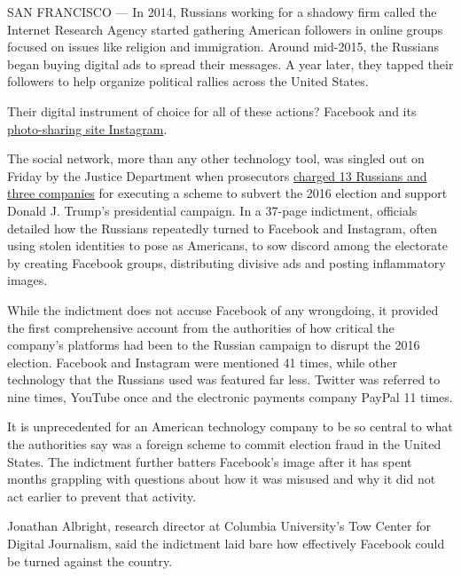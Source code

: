SAN FRANCISCO --- In 2014, Russians working for a shadowy firm called
the Internet Research Agency started gathering American followers in
online groups focused on issues like religion and immigration. Around
mid-2015, the Russians began buying digital ads to spread their
messages. A year later, they tapped their followers to help organize
political rallies across the United States.

Their digital instrument of choice for all of these actions? Facebook
and its
\href{https://www.nytimes3xbfgragh.onion/2017/12/17/technology/instagram-russian-trolls.html}{photo-sharing
site Instagram}.

The social network, more than any other technology tool, was singled out
on Friday by the Justice Department when prosecutors
\href{https://www.nytimes3xbfgragh.onion/2018/02/16/us/politics/russians-indicted-mueller-election-interference.html?hp\&action=click\&pgtype=Homepage\&clickSource=story-heading\&module=a-lede-package-region\&region=top-news\&WT.nav=top-news}{charged
13 Russians and three companies} for executing a scheme to subvert the
2016 election and support Donald J. Trump's presidential campaign. In a
37-page indictment, officials detailed how the Russians repeatedly
turned to Facebook and Instagram, often using stolen identities to pose
as Americans, to sow discord among the electorate by creating Facebook
groups, distributing divisive ads and posting inflammatory images.

While the indictment does not accuse Facebook of any wrongdoing, it
provided the first comprehensive account from the authorities of how
critical the company's platforms had been to the Russian campaign to
disrupt the 2016 election. Facebook and Instagram were mentioned 41
times, while other technology that the Russians used was featured far
less. Twitter was referred to nine times, YouTube once and the
electronic payments company PayPal 11 times.

It is unprecedented for an American technology company to be so central
to what the authorities say was a foreign scheme to commit election
fraud in the United States. The indictment further batters Facebook's
image after it has spent months grappling with questions about how it
was misused and why it did not act earlier to prevent that activity.

Jonathan Albright, research director at Columbia University's Tow Center
for Digital Journalism, said the indictment laid bare how effectively
Facebook could be turned against the country.

